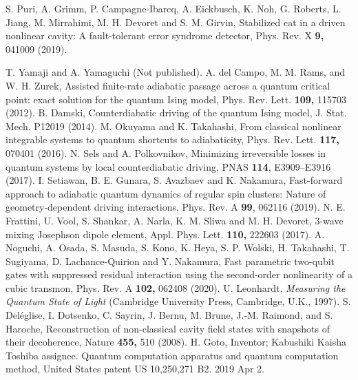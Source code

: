 \documentclass[%
 reprint,
 amsmath,amssymb,
 aps,
pra,
]{revtex4-2}
\begin{document}
\begin{thebibliography}{99}
 S. Puri, A. Grimm, P. Campagne-Ibarcq, A. Eickbusch, K. Noh, G. Roberts, L. Jiang, M. Mirrahimi, M. H. Devoret and S. M. Girvin,
Stabilized cat in a driven nonlinear cavity: A fault-tolerant error syndrome detector,
Phys. Rev. X {\bf 9,} 041009  (2019).

 T. Yamaji and A. Yamaguchi (Not published).
 A. del Campo, M. M. Rams, and W. H. Zurek,
Assisted finite-rate adiabatic passage across a quantum critical point: exact solution for the quantum Ising model,
Phys. Rev. Lett. {\bf 109,} 115703  (2012).
 B. Damski, 
Counterdiabatic driving of the quantum Ising model,
J. Stat. Mech. P12019 (2014).
 M. Okuyama and K. Takahashi, 
From classical nonlinear integrable systems to quantum shortcuts to adiabaticity,
Phys. Rev. Lett. {\bf 117,} 070401 (2016).
 N. Sels and  A. Polkovnikov, 
Minimizing irreversible losses in quantum systems by local counterdiabatic driving, 
PNAS {\bf 114}, E3909--E3916 (2017).
 I. Setiawan, B. E. Gunara, S. Avazbaev and K. Nakamura, 
Fast-forward approach to adiabatic quantum dynamics of regular spin clusters: Nature of geometry-dependent driving interactions,
Phys. Rev. A {\bf 99}, 062116 (2019).
 N. E. Frattini, U. Vool, S. Shankar, A. Narla, K. M. Sliwa and M. H.  Devoret, 
3-wave mixing Josephson dipole element,
{Appl. Phys. Lett.} {\bf 110,} 222603 (2017).
 A. Noguchi, A. Osada, S.  Masuda, S. Kono,  K. Heya, S. P.  Wolski, H. Takahashi,  T. Sugiyama,  D. Lachance-Quirion and Y. Nakamura, 
Fast parametric two-qubit gates with suppressed residual interaction using the second-order nonlinearity of a cubic transmon,
{Phys. Rev.} A {\bf 102,} 062408 (2020).
 U. Leonhardt, {\it Measuring the Quantum State of Light} (Cambridge
University Press, Cambridge, U.K., 1997).
 S. Del\'{e}glise, I. Dotsenko, C. Sayrin, J. Bernu, M. Brune, J.-M. Raimond, and S. Haroche, 
Reconstruction of non-classical cavity field states with snapshots of their decoherence,
Nature {\bf 455,} 510 (2008).
 H. Goto, Inventor; Kabushiki Kaisha Toshiba assignee. Quantum computation apparatus and quantum computation method, 
United States patent US 10,250,271 B2. 2019 Apr 2.







\end{thebibliography}
\end{document}
